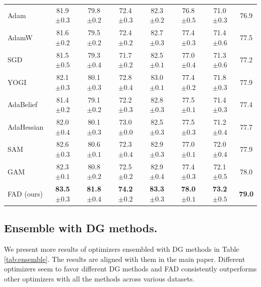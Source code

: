 \begin{table}[th]
\begin{tabular}{lcccccc|c}
Adam  & 81.9 \footnotesize{$\pm 0.3$} &  79.8 \footnotesize{$\pm 0.2$} & 72.4 \footnotesize{$\pm 0.3$} & 82.3 \footnotesize{$\pm 0.2$} & 76.8 \footnotesize{$\pm 0.5$} & 71.0 \footnotesize{$\pm 0.3$} & 76.9  \\
AdamW  & 81.6 \footnotesize{$\pm 0.2$} &  79.5 \footnotesize{$\pm 0.2$} & 72.4 \footnotesize{$\pm 0.2$} & 82.7 \footnotesize{$\pm 0.3$} & 77.4 \footnotesize{$\pm 0.3$} & 71.4 \footnotesize{$\pm 0.6$} & 77.5 \\
SGD  & 81.5 \footnotesize{$\pm 0.5$} &  79.3 \footnotesize{$\pm 0.4$} & 71.7 \footnotesize{$\pm 0.2$} & 82.5 \footnotesize{$\pm 0.1$} & 77.0 \footnotesize{$\pm 0.4$} & 71.3 \footnotesize{$\pm 0.6$} & 77.2 \\
YOGI  & 82.1 \footnotesize{$\pm 0.3$} &  80.1 \footnotesize{$\pm 0.3$} & 72.8 \footnotesize{$\pm 0.4$} & 83.0 \footnotesize{$\pm 0.1$} & 77.4 \footnotesize{$\pm 0.2$} & 71.8 \footnotesize{$\pm 0.3$} & 77.9 \\
AdaBelief  & 81.4 \footnotesize{$\pm 0.2$} &  79.1 \footnotesize{$\pm 0.2$} & 72.2 \footnotesize{$\pm 0.3$} & 82.8 \footnotesize{$\pm 0.3$} & 77.5 \footnotesize{$\pm 0.1$} & 71.4 \footnotesize{$\pm 0.3$} & 77.4 \\
AdaHessian  & 82.0 \footnotesize{$\pm 0.4$} &  80.1 \footnotesize{$\pm 0.3$} & 73.0 \footnotesize{$\pm 0.0$} & 82.5 \footnotesize{$\pm 0.3$} & 77.5 \footnotesize{$\pm 0.3$} & 71.2 \footnotesize{$\pm 0.4$} & 77.7 \\
SAM  & 82.6 \footnotesize{$\pm 0.3$} & 80.6 \footnotesize{$\pm 0.1$} & 72.3 \footnotesize{$\pm 0.4$} & 82.9 \footnotesize{$\pm 0.3$} & 77.0 \footnotesize{$\pm 0.1$} & 72.0 \footnotesize{$\pm 0.4$} & 77.9 \\
GAM  & 82.3 \footnotesize{$\pm 0.1$} & 80.8 \footnotesize{$\pm 0.2$} & 72.5 \footnotesize{$\pm 0.2$} & 82.9 \footnotesize{$\pm 0.4$} & 77.4 \footnotesize{$\pm 0.3$} & 72.1 \footnotesize{$\pm 0.5$} & 78.0 \\
\midrule
FAD (ours) & \textbf{83.5} \footnotesize{$\pm 0.3$} & \textbf{81.8} \footnotesize{$\pm 0.4$} & \textbf{74.2} \footnotesize{$\pm 0.2$} & \textbf{83.3} \footnotesize{$\pm 0.3$} & \textbf{78.0} \footnotesize{$\pm 0.1$} & \textbf{73.2} \footnotesize{$\pm 0.5$} & \textbf{79.0} \\

\bottomrule
\end{tabular}
\label{tab:nico10k}
\end{table}


\subsection{Ensemble with DG methods.}
\label{sec:ensemble}
We present more results of optimizers ensembled with DG methods in Table \ref{tab:ensemble}. The results are aligned with them in the main paper. Different optimizers seem to favor different DG methods and FAD consistently outperforms other optimizers with all the methods across various datasets.

